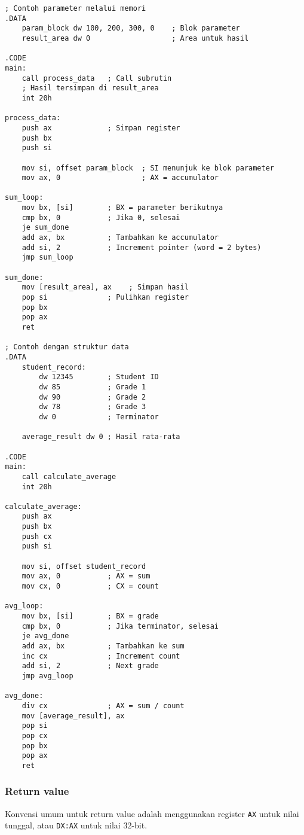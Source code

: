 \documentclass[../main.tex]{subfiles}
\begin{document}
                \begin{lstlisting}[language={[x86masm]Assembler}, caption=Parameter melalui Memori, label={lst:param-memory}]
; Contoh parameter melalui memori
.DATA
    param_block dw 100, 200, 300, 0    ; Blok parameter
    result_area dw 0                   ; Area untuk hasil

.CODE
main:
    call process_data   ; Call subrutin
    ; Hasil tersimpan di result_area
    int 20h

process_data:
    push ax             ; Simpan register
    push bx
    push si
    
    mov si, offset param_block  ; SI menunjuk ke blok parameter
    mov ax, 0                   ; AX = accumulator
    
sum_loop:
    mov bx, [si]        ; BX = parameter berikutnya
    cmp bx, 0           ; Jika 0, selesai
    je sum_done
    add ax, bx          ; Tambahkan ke accumulator
    add si, 2           ; Increment pointer (word = 2 bytes)
    jmp sum_loop
    
sum_done:
    mov [result_area], ax    ; Simpan hasil
    pop si              ; Pulihkan register
    pop bx
    pop ax
    ret

; Contoh dengan struktur data
.DATA
    student_record:
        dw 12345        ; Student ID
        dw 85           ; Grade 1
        dw 90           ; Grade 2
        dw 78           ; Grade 3
        dw 0            ; Terminator
    
    average_result dw 0 ; Hasil rata-rata

.CODE
main:
    call calculate_average
    int 20h

calculate_average:
    push ax
    push bx
    push cx
    push si
    
    mov si, offset student_record
    mov ax, 0           ; AX = sum
    mov cx, 0           ; CX = count
    
avg_loop:
    mov bx, [si]        ; BX = grade
    cmp bx, 0           ; Jika terminator, selesai
    je avg_done
    add ax, bx          ; Tambahkan ke sum
    inc cx              ; Increment count
    add si, 2           ; Next grade
    jmp avg_loop
    
avg_done:
    div cx              ; AX = sum / count
    mov [average_result], ax
    pop si
    pop cx
    pop bx
    pop ax
    ret
                \end{lstlisting}

            \subsubsection{Return value}
                Konvensi umum untuk return value adalah menggunakan register \texttt{AX} untuk nilai tunggal, atau \texttt{DX:AX} untuk nilai 32-bit.
\end{document}
